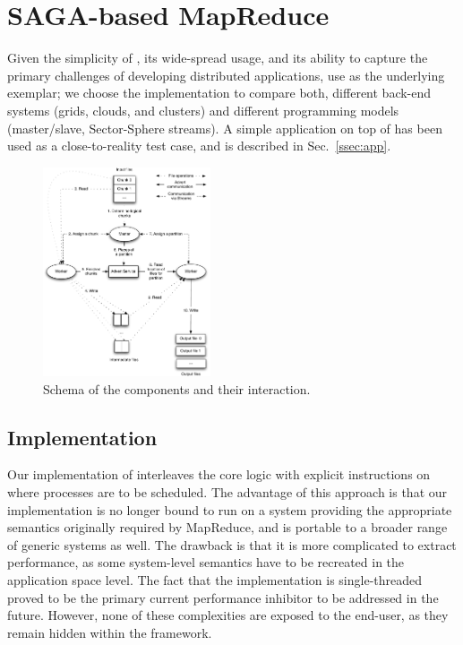\documentclass[3p,twocolumn]{elsarticle}
\begin{document}
\section{SAGA-based MapReduce}
\label{sec:mr}

Given the simplicity of \mr, its wide-spread usage, and its ability to
capture the primary challenges of developing distributed applications,
use \mr as the underlying exemplar; we choose the \smr implementation
to compare both, different back-end systems (grids, clouds, and
clusters) and different programming models (master/slave,
Sector-Sphere streams).  A simple \wc application on top of \smr has
been used as a close-to-reality test case, and is described in
Sec.~\ref{ssec:app}.

\begin{figure}[htb!]
 \includegraphics[width=0.44\textwidth]{figures/saga_mapreduce_schema.pdf}
 \caption{ Schema of the \sagamapreduce components and their
   interaction.
   \label{fig:saga_mr_schema}
   }
\end{figure}



\subsection{\sagamapreduce Implementation}

Our implementation of \sagamapreduce interleaves the core \mr logic
with explicit instructions on where processes are to be scheduled.
The advantage of this approach is that our implementation is no longer
bound to run on a system providing the appropriate semantics
originally required by MapReduce, and is portable to a broader range
of generic systems as well.  The drawback is that it is more
complicated to extract performance, as some system-level semantics have
to be recreated in the application space level.
The fact that the implementation is single-threaded proved to be the
primary current performance inhibitor to be addressed in the future.  However, none of these
complexities are exposed to the end-user, as they remain hidden within
the framework.
\end{document}
